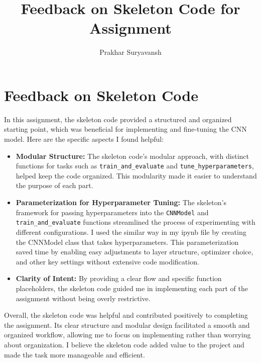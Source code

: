 \documentclass{article}
\title{Feedback on Skeleton Code for Assignment}
\author{Prakhar Suryavansh}
\date{}
\begin{document}
\maketitle

\section*{Feedback on Skeleton Code}

In this assignment, the skeleton code provided a structured and organized starting point, which was beneficial for implementing and fine-tuning the CNN model. Here are the specific aspects I found helpful:

\begin{itemize}
  \item \textbf{Modular Structure:} The skeleton code's modular approach, with distinct functions for tasks such as \texttt{train\_and\_evaluate} and \texttt{tune\_hyperparameters}, helped keep the code organized. This modularity made it easier to understand the purpose of each part.

  \item \textbf{Parameterization for Hyperparameter Tuning:} The skeleton's framework for passing hyperparameters into the \texttt{CNNModel} and \texttt{train\_and\_evaluate} functions streamlined the process of experimenting with different configurations. I used the similar way in my ipynb file by creating the CNNModel class that takes hyperparameters. This parameterization saved time by enabling easy adjustments to layer structure, optimizer choice, and other key settings without extensive code modification.

  \item \textbf{Clarity of Intent:} By providing a clear flow and specific function placeholders, the skeleton code guided me in implementing each part of the assignment without being overly restrictive.

\end{itemize}

Overall, the skeleton code was helpful and contributed positively to completing the assignment. Its clear structure and modular design facilitated a smooth and organized workflow, allowing me to focus on implementing rather than worrying about organization. I believe the skeleton code added value to the project and made the task more manageable and efficient.
\end{document}
